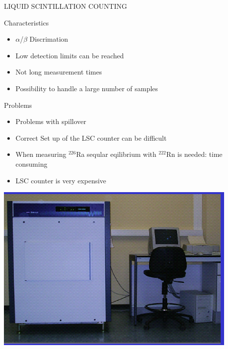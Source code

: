 \begin{frame}[allowframebreaks]{LIQUID SCINTILLATION COUNTING }

\begin{exampleblock}{Characteristics}

\begin{itemize}
	\item $\alpha$/$\beta$ Discrimation
 \item Low detection limits can be reached
 \item Not long measurement times
 \item Possibility to handle a large number of samples  
\end{itemize}

\end{exampleblock}

\begin{alertblock}{Problems}

\begin{itemize}
	\item Problems with spillover
 \item Correct Set up of the LSC counter can be difficult
 \item When measuring $^{226}$Ra seqular eqilibrium with $^{222}$Rn is needed: time consuming
 \item LSC counter is very expensive
\end{itemize}

\end{alertblock}

%

\centering
\includegraphics[scale=0.5]{figures/quantulus.png}

\end{frame}

